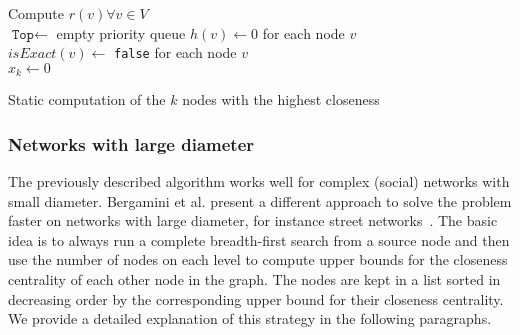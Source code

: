 \begin{algorithm2e}[h!]
 \label{alg:borassiStatic}
 Compute $r(v) \forall v \in V$ \label{alg:borassiStaticPreprocessing}\\
 $\texttt{Top} \gets $ empty priority queue
 $h(v) \gets 0$ for each node $v$\\
 $isExact(v) \gets $ \texttt{false} for each node $v$\\
 $x_k \gets 0$\\

 \caption{Static computation of the $k$ nodes with the highest closeness}
\end{algorithm2e}

\subsubsection{Networks with large diameter}
\label{sec:largeDiameterStatic}
The previously described algorithm works well for complex (social) networks with small diameter. Bergamini et al. present a different approach to solve the problem faster on networks with large diameter, for instance street networks~\cite{bergamini2016computing}. The basic idea is to always run a complete breadth-first search from a source node and then use the number of nodes on each level to compute upper bounds for the closeness centrality of each other node in the graph. The nodes are kept in a list sorted in decreasing order by the corresponding upper bound for their closeness centrality. We provide a detailed explanation of this strategy in the following paragraphs. 


